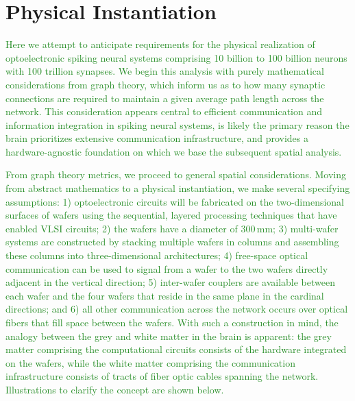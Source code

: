 \documentclass[twocolumn]{article}
\begin{document}

\section{\label{sec:instantiation}Physical Instantiation}
\textcolor{ForestGreen}{Here we attempt to anticipate requirements for the physical realization of optoelectronic spiking neural systems comprising 10 billion to 100 billion neurons with 100 trillion synapses. We begin this analysis with purely mathematical considerations from graph theory, which inform us as to how many synaptic connections are required to maintain a given average path length across the network. This consideration appears central to efficient communication and information integration in spiking neural systems, is likely the primary reason the brain prioritizes extensive communication infrastructure, and provides a hardware-agnostic foundation on which we base the subsequent spatial analysis.}

\textcolor{ForestGreen}{From graph theory metrics, we proceed to general spatial considerations. Moving from abstract mathematics to a physical instantiation, we make several specifying assumptions: 1) optoelectronic circuits will be fabricated on the two-dimensional surfaces of wafers using the sequential, layered processing techniques that have enabled VLSI circuits; 2) the wafers have a diameter of 300\,mm; 3) multi-wafer systems are constructed by stacking multiple wafers in columns and assembling these columns into three-dimensional architectures; 4) free-space optical communication can be used to signal from a wafer to the two wafers directly adjacent in the vertical direction; 5) inter-wafer couplers are available between each wafer and the four wafers that reside in the same plane in the cardinal directions; and 6) all other communication across the network occurs over optical fibers that fill space between the wafers. With such a construction in mind, the analogy between the grey and white matter in the brain is apparent: the grey matter comprising the computational circuits consists of the hardware integrated on the wafers, while the white matter comprising the communication infrastructure consists of tracts of fiber optic cables spanning the network. Illustrations to clarify the concept are shown below.}
\end{document}
